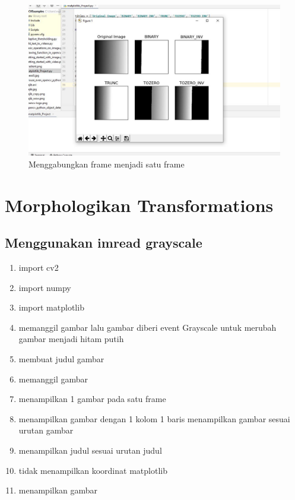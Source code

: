 \begin{figure}[ht]
\centering
\includegraphics[scale=0.5]{figures/2,49.jpg}
\caption{Menggabungkan frame menjadi satu frame}
\label{contoh}
\end{figure}




\newpage
\section{Morphologikan Transformations}
\subsection{Menggunakan imread grayscale}

\begin{enumerate}
	\item import cv2
	\item import numpy
	\item import matplotlib
	\item memanggil gambar lalu gambar diberi event Grayscale untuk merubah gambar menjadi hitam putih
	\item membuat judul gambar
	\item memanggil gambar
	\item menampilkan 1 gambar pada satu frame
	\item menampilkan gambar dengan 1 kolom 1 baris menampilkan gambar sesuai urutan gambar
	\item menampilkan judul sesuai urutan judul
	\item tidak menampilkan koordinat matplotlib
	\item menampilkan gambar
\end{enumerate}

